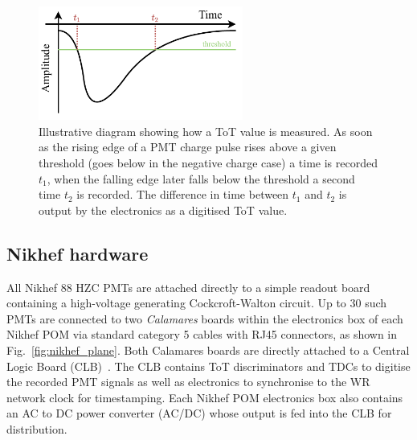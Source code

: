 \begin{figure} %
    \includegraphics[width=0.6\textwidth]{diagrams/5-daq/tot.pdf}
    \caption[Illustrative diagram showing how Time over Threshold is measured.]
    {Illustrative diagram showing how a ToT value is measured. As soon as the rising edge of a PMT
        charge pulse rises above a given threshold (goes below in the negative charge case) a time
        is recorded $t_{1}$, when the falling edge later falls below the threshold a second time
        $t_{2}$ is recorded. The difference in time between $t_{1}$ and $t_{2}$ is output by the
        electronics as a digitised ToT value.}
    \label{fig:tot}
\end{figure}

\subsection{Nikhef hardware} %
\label{sec:daq_hard_Nikhed} %

All Nikhef \unit{88}{} HZC PMTs are attached directly to a simple readout board
containing a high-voltage generating Cockcroft-Walton circuit. Up to 30 such PMTs are connected to
two \emph{Calamares} boards within the electronics box of each Nikhef POM via standard category 5
cables with RJ45 connectors, as shown in Fig.~\ref{fig:nikhef_plane}. Both Calamares boards are
directly attached to a Central Logic Board (CLB)~\cite{biagi2015, eijk2015}. The CLB contains ToT
discriminators and TDCs to digitise the recorded PMT signals as well as electronics to synchronise
to the WR network clock for timestamping. Each Nikhef POM electronics box also contains an AC to
DC power converter (AC/DC) whose output is fed into the CLB for distribution.

